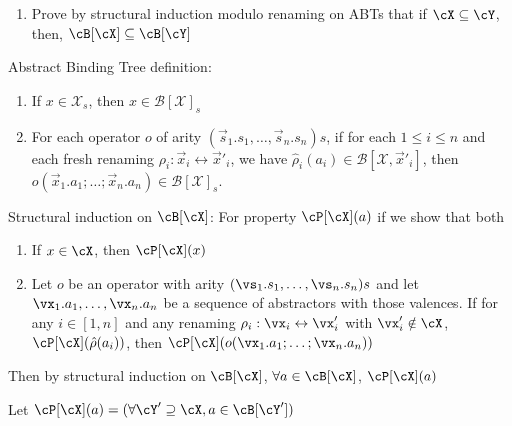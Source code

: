 \documentclass[11pt]{book}
\begin{document}
\begin{enumerate}
    \item[1.2] Prove by structural induction modulo renaming on ABTs that if $\cX \subseteq \cY$, then, $\cB[\cX] \subseteq \cB[\cY]$
\end{enumerate}

\br

Abstract Binding Tree definition:
\begin{enumerate}
    \item If $x \in \mathcal{X}_{s}$, then $x \in \mathcal{B[X]}_{s}$
    \item For each operator $o$ of arity $(\vec{s}_1.s_1,\dots,\vec{s}_n.s_n)s$, if for each $1 \leq i \leq n$ and each fresh renaming $\rho_i : \vec{x}_i \leftrightarrow \vec{x}'_i$, we have $\hat{\rho}_i(a_i) \in \mathcal{B}[\mathcal{X},\vec{x}'_i]$, then $o(\vec{x}_1.a_1;\dots;\vec{x}_n.a_n) \in \mathcal{B[X]}_s$.
\end{enumerate}

Structural induction on $\cB[\cX]$: For property $\cP[\cX](a)$ if we show that both
\begin{enumerate}
    \item If $x \in \cX$, then $\cP[\cX](x)$ 
    \item Let $o$ be an operator with arity $(\vs_1.s_1,\dots,\vs_n.s_n)s$ and let $\vx_1.a_1,\dots,\vx_n.a_n$ be a sequence of abstractors with those valences. If for any $i \in [1,n]$ and any renaming $\rho_i: \vx_i \leftrightarrow \vx'_i$ with $\vx'_i \notin \cX$, $\cP[\cX](\hat{\rho}(a_i))$, then $\cP[\cX](o(\vx_1.a_1;\dots;\vx_n.a_n))$
\end{enumerate}
Then by structural induction on $\cB[\cX]$, $\forall a \in \cB[\cX]$, $\cP[\cX](a)$

\br

Let $\cP[\cX](a) = (\forall \cY' \supseteq \cX, a \in \cB[\cY'])$
\end{document}
